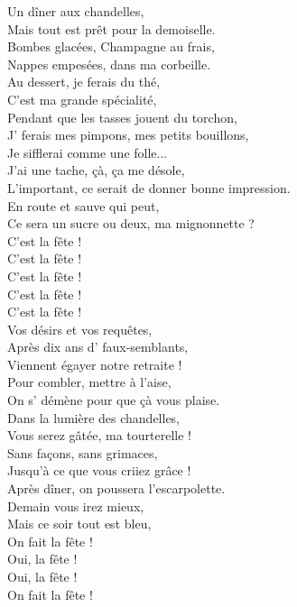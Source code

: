 \documentclass{novel}
\begin{document}
\begin{multicols}{2}
Un dîner aux chandelles, \\
Mais tout est prêt pour la demoiselle. \\
Bombes glacées, Champagne au frais, \\
Nappes empesées, dans ma corbeille. \\
Au dessert, je ferais du thé, \\
C'est ma grande spécialité, \\
Pendant que les tasses jouent du torchon, \\
J' ferais mes pimpons, mes petits bouillons, \\
Je sifflerai comme une folle... \\
J'ai une tache, çà, ça me désole, \\
L'important, ce serait de donner bonne impression. \\
En route et sauve qui peut, \\
Ce sera un sucre ou deux, ma mignonnette ? \\

C'est la fête ! \\
C'est la fête ! \\
C'est la fête ! \\
C'est la fête ! \\
C'est la fête ! \\

Vos désirs et vos requêtes, \\
Après dix ans d' faux-semblants, \\
Viennent égayer notre retraite ! \\

Pour combler, mettre à l'aise, \\
On s' démène pour que çà vous plaise. \\
Dans la lumière des chandelles, \\
Vous serez gâtée, ma tourterelle ! \\

Sans façons, sans grimaces, \\
Jusqu'à ce que vous criiez grâce ! \\
Après dîner, on poussera l'escarpolette. \\
Demain vous irez mieux, \\
Mais ce soir tout est bleu, \\
On fait la fête ! \\
Oui, la fête ! \\
Oui, la fête ! \\
On fait la fête ! \\
\end{multicols}
\end{document}
